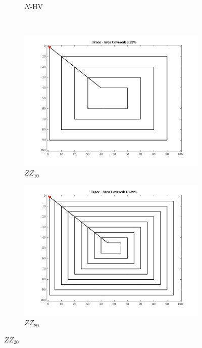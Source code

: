 \begin{figure}[htb!]
\begin{subfigure}[t]{0.25\textwidth}
        \caption{$N$-HV}
    \end{subfigure}%
    \\
    \begin{subfigure}[t]{0.25\textwidth}
        \centering
        \includegraphics[width=\linewidth]{figures/path_zz_10p_100x100_sf_100_seed_1.png}
        \captionsetup{skip=0.20\baselineskip,size=footnotesize}
        \caption{$ZZ_{10}$}
    \end{subfigure}%
    \begin{subfigure}[t]{0.25\textwidth}
        \centering
        \includegraphics[width=\linewidth]{figures/path_zz_20p_100x100_sf_100_seed_1.png}
        \captionsetup{skip=0.20\baselineskip,size=footnotesize}
        \caption{$ZZ_{20}$}

\end{subfigure}
\end{figure}
